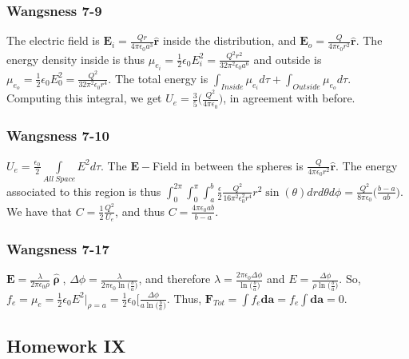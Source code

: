 \documentclass[crop=false,class=book,oneside]{standalone}
\begin{document}
            \subsubsection{Wangsness 7-9}
                The electric field is $\mathbf{E}_i = \frac{Qr}{4\pi \epsilon_0 a^3}\hat{\mathbf{r}}$
                inside the distribution, and $\mathbf{E}_o = \frac{Q}{4\pi\epsilon_0r^2}\hat{\mathbf{r}}$.
                The energy density inside is thus
                $\mu_{e_i} = \frac{1}{2}\epsilon_0 E_i^2=\frac{Q^2r^2}{32\pi^2 \epsilon_0 a^6}$
                and outside is $\mu_{e_o} = \frac{1}{2}\epsilon_0 E_0^2 = \frac{Q^2}{32\pi^2 \epsilon_0 r^4}$.
                The total energy is $\int_{Inside} \mu_{e_i}d\tau + \int_{Outside} \mu_{e_o}d\tau$.
                Computing this integral, we get $U_e = \frac{3}{5}\bigg( \frac{Q^2}{4\pi \epsilon_0}\bigg)$,
                in agreement with before.
            \subsubsection{Wangsness 7-10}
                $U_e = \frac{\epsilon_0}{2} \underset{All\ Space}\int E^2 d\tau$.
                The $\mathbf{E}-$Field in between the spheres is
                $\frac{Q}{4\pi \epsilon_0 r^2}\hat{\mathbf{r}}$.
                The energy associated to this region is thus
                $\int_{0}^{2\pi}\int_{0}^{\pi}\int_{a}^{b} \frac{\epsilon}{2} \frac{Q^2}{16\pi^2 \epsilon_0^2 r^4}r^2\sin(\theta) dr d\theta d\phi = \frac{Q^2}{8\pi \epsilon_0}\bigg(\frac{b-a}{ab}\bigg)$.
                We have that $C = \frac{1}{2} \frac{Q^2}{U_e}$, and thus $C=\frac{4\pi \epsilon_0 ab}{b-a}$.
            \subsubsection{Wangsness 7-17}
                $\mathbf{E} = \frac{\lambda}{2\pi\epsilon_0\rho}\hat{\boldsymbol{\uprho}}$,
                $\Delta\phi = \frac{\lambda}{2\pi \epsilon_0 \ln\big(\frac{b}{a}\big)}$,
                and therefore $\lambda=\frac{2\pi \epsilon_0 \Delta\phi}{\ln\big(\frac{b}{a}\big)}$
                and $E = \frac{\Delta \phi}{\rho \ln\big(\frac{b}{a}\big)}$.
                So, $f_e = \mu_e = \frac{1}{2} \epsilon_0 E^2\bigg|_{\rho = a} = \frac{1}{2} \epsilon_0 \bigg[ \frac{\Delta\phi}{a \ln\big(\frac{b}{a}\big)}$.
                Thus, $\mathbf{F}_{Tot} = \int f_e \mathbf{da} = f_e \int \mathbf{da} = 0$.
        \subsection{Homework IX}
\end{document}
